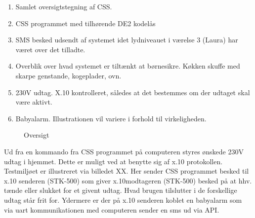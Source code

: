 \begin{enumerate}
\item Samlet oversigtstegning af CSS. 
\item CSS programmet med tilhørende DE2 kodelås
\item SMS besked udsendt af systemet idet lydniveauet i værelse 3 (Laura) har været over det tilladte.
\item Overblik over hvad systemet er tiltænkt at børnesikre. Køkken skuffe med skarpe genstande, kogeplader, ovn.
\item 230V udtag. X.10 kontrolleret, således at det bestemmes om der udtaget skal være aktivt.
\item Babyalarm. Illustrationen vil variere i forhold til virkeligheden.
\end{enumerate}

\begin{figure}[h] \centering
{}
\caption{Oversigt}
\label{lab:Oversigt}
\end{figure}


Ud fra en kommando fra CSS programmet på computeren styres ønskede 230V udtag i hjemmet. Dette er muligt ved at benytte sig af x.10 protokollen. Testmiljøet er illustreret via billedet XX. Her sender CSS programmet besked til x.10 senderen (STK-500) som giver x.10modtageren (STK-500) besked på at hhv. tænde eller slukket for et givent udtag. Hvad brugen tilslutter i de forskellige udtag står frit for. Ydermere er der på x.10 senderen koblet en babyalarm som via uart kommunikationen med computeren sender en sms ud via API.